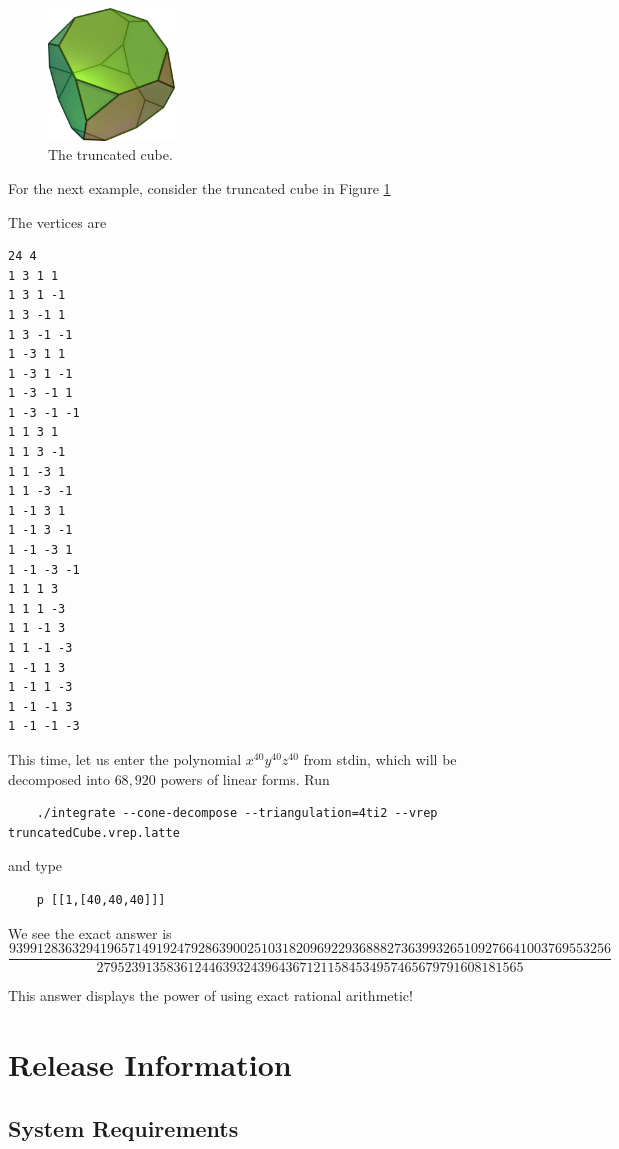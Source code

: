 \documentclass{article}
\begin{document}
\begin{figure}[thb]
	\centering
	\includegraphics[width=0.3\textwidth]{truncatedCube.jpg}
\caption{The truncated cube.}
	\label{fig:truncated-cube}
\end{figure}	
	
For the next example, consider the truncated cube in Figure \ref{fig:truncated-cube}	

	
The vertices are
\begin{verbatim}
24 4
1 3 1 1
1 3 1 -1
1 3 -1 1
1 3 -1 -1
1 -3 1 1
1 -3 1 -1
1 -3 -1 1
1 -3 -1 -1
1 1 3 1
1 1 3 -1
1 1 -3 1
1 1 -3 -1
1 -1 3 1
1 -1 3 -1
1 -1 -3 1
1 -1 -3 -1
1 1 1 3
1 1 1 -3
1 1 -1 3
1 1 -1 -3
1 -1 1 3
1 -1 1 -3
1 -1 -1 3
1 -1 -1 -3
\end{verbatim}

This time, let us enter the polynomial $x^{40}y^{40}z^{40}$ from stdin, which
will be decomposed into $68,920$ powers of linear forms. Run
	
	\begin{verbatim}
	./integrate --cone-decompose --triangulation=4ti2 --vrep truncatedCube.vrep.latte 
	\end{verbatim}

and type
	\begin{verbatim}
	p [[1,[40,40,40]]]
	\end{verbatim}


We see the exact answer is 
\begin{displaymath}
\frac{93991283632941965714919247928639002510318209692293688827363993265109276641003769553256}{2795239135836124463932439643671211584534957465679791608181565}
\end{displaymath}
	
This answer displays the power of using exact rational arithmetic!	
	
\section{Release Information}

\subsection{System Requirements}
\end{document}
